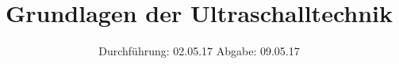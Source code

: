 

\subject{US1}
\title{Grundlagen der Ultraschalltechnik}
\date{
  Durchführung: 02.05.17
  \hspace{3em}
  Abgabe: 09.05.17
}



\maketitle
\thispagestyle{empty}
\tableofcontents
\newpage






\printbibliography


